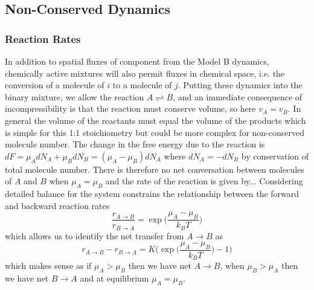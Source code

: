 \subsection{Non-Conserved Dynamics}

\subsubsection{Reaction Rates}
In addition to spatial fluxes of component from the Model B dynamics, chemically active mixtures will also permit fluxes in chemical space, i.e. the conversion of a molecule of $i$ to a molecule of $j$. Putting these dynamics into the binary mixture, we allow the reaction $A \rightleftharpoons B$, and an immediate consequence of incompressibility is that the reaction must conserve volume, so here $v_A = v_B$. In general the volume of the reactants must equal the volume of the products which is simple for this 1:1 stoichiometry but could be more complex for non-conserved molecule number. The change in the free energy due to the reaction is $dF = \mu_A dN_A+\mu_B dN_B = (\mu_A - \mu_B)dN_A$ where $dN_A = -dN_B$ by conservation of total molecule number. There is therefore no net conversation between molecules of $A$ and $B$ when $\mu_A = \mu_B$ and  the rate of the reaction is given by... Considering detailed balance for the system constrains the relationship between the forward and backward reaction rates
\begin{equation}
    \frac{r_{A \rightarrow B}}{r_{B \rightarrow A}} = \exp\Bigg(\frac{\mu_A - \mu_B}{k_B T}\Bigg)
    \label{db_constr}
\end{equation}
which allows us to identify the net transfer from $A \rightarrow B$ as
\begin{equation}
    r_{A \rightarrow B} - r_{B \rightarrow A} = K\Bigg(\exp\bigg(\frac{\mu_A - \mu_B}{k_B T}\bigg)-1\Bigg)
    \label{react_rates}
\end{equation}
which makes sense as if $\mu_A > \mu_B$ then we have net $A \rightarrow B$, when $\mu_B > \mu_A$ then we have net $B \rightarrow A$ and at equilibrium $\mu_A = \mu_B$\cite{weber2019physics}.

